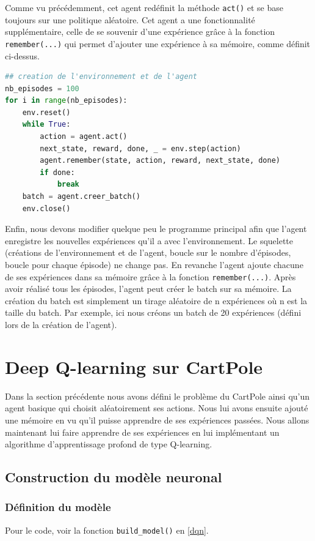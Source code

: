 \documentclass[10pt,a4paper]{article}
\begin{document}
Comme vu précédemment, cet agent redéfinit la méthode \lstinline{act()} et se base toujours sur une politique aléatoire. Cet agent a une fonctionnalité supplémentaire, celle de se souvenir d'une expérience grâce à la fonction \lstinline{remember(...)} qui permet d'ajouter une expérience à sa mémoire, comme définit ci-dessus.

\begin{lstlisting}[language=Python, caption=Programme principal de l'agent utilisant l'expérience replay]
## creation de l'environnement et de l'agent
nb_episodes = 100
for i in range(nb_episodes):
    env.reset()
    while True:
        action = agent.act()
        next_state, reward, done, _ = env.step(action)
        agent.remember(state, action, reward, next_state, done)
        if done:
            break
    batch = agent.creer_batch()
    env.close()
\end{lstlisting}

Enfin, nous devons modifier quelque peu le programme principal afin que l'agent enregistre les nouvelles expériences qu'il a avec l'environnement. Le squelette (créations de l'environnement et de l'agent, boucle sur le nombre d'épisodes, boucle pour chaque épisode) ne change pas. En revanche l'agent ajoute chacune de ses expériences dans sa mémoire grâce à la fonction \lstinline{remember(...)}. Après avoir réalisé tous les épisodes, l'agent peut créer le batch sur sa mémoire. La création du batch est simplement un tirage aléatoire de n expériences où n est la taille du batch. Par exemple, ici nous créons un batch de 20 expériences (défini lors de la création de l'agent).

\section{Deep Q-learning sur CartPole}

Dans la section précédente nous avons défini le problème du CartPole ainsi qu'un agent basique qui choisit aléatoirement ses actions. Nous lui avons ensuite ajouté  une mémoire en vu qu'il puisse apprendre de ses expériences passées. Nous allons maintenant lui faire apprendre de ses expériences en lui implémentant un algorithme d'apprentissage profond de type Q-learning.

\subsection{Construction du modèle neuronal}

\subsubsection{Définition du modèle}
Pour le code, voir la fonction \lstinline{build_model()} en \ref{dqn}.
\end{document}
